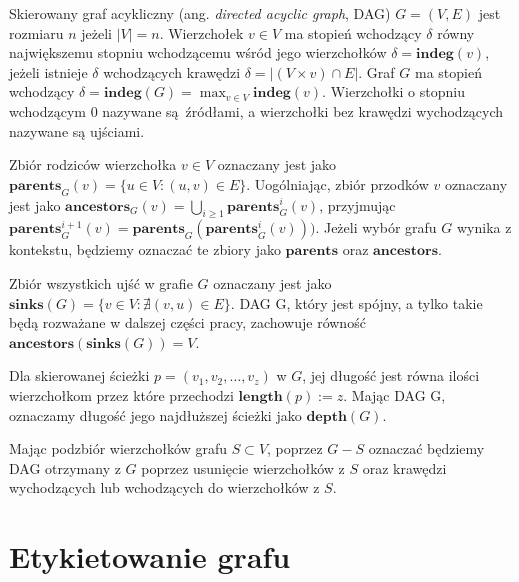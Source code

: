 Skierowany graf acykliczny (ang. \textit{directed acyclic graph}, DAG) $G = (V, E)$ jest rozmiaru $n$ jeżeli $|V| = n$.
Wierzchołek $v \in V$ ma stopień wchodzący $\delta$ równy największemu stopniu wchodzącemu wśród jego wierzchołków $\delta = \mathbf{indeg}(v)$, jeżeli istnieje $\delta$ wchodzących krawędzi $\delta = | \left( V \times {v} \right) \cap E|$.
Graf $G$ ma stopień wchodzący $ \delta = \mathbf{indeg}(G) = \max_{v \in V} \mathbf{indeg}(v)$.
Wierzchołki o stopniu wchodzącym 0 nazywane są źródłami, a wierzchołki bez krawędzi wychodzących nazywane są ujściami.

Zbiór rodziców wierzchołka $v \in V$ oznaczany jest jako $\mathbf{parents}_{G}(v) = \{ u \in V: (u, v) \in E \}$.
Uogólniając, zbiór przodków $v$ oznaczany jest jako $\mathbf{ancestors}_{G}(v) = \bigcup_{i \geq 1}\mathbf{parents}_{G}^{i}(v)$, przyjmując $\mathbf{parents}_{G}^{i+1}(v) = \mathbf{parents}_{G}(\mathbf{parents}_{G}^{i}(v)))$. Jeżeli wybór grafu $G$ wynika z kontekstu, będziemy oznaczać te zbiory jako $\mathbf{parents}$ oraz $\mathbf{ancestors}$.

Zbiór wszystkich ujść w grafie $G$ oznaczany jest jako $\mathbf{sinks}(G) = \{ v \in V : \nexists (v, u) \in E \}$. DAG G, który jest spójny, a tylko takie będą rozważane w dalszej części pracy, zachowuje równość $\mathbf{ancestors}(\mathbf{sinks}(G)) = V$.

Dla skierowanej ścieżki $p = (v_{1},v_{2},\dots,v_{z})$ w $G$, jej długość jest równa ilości wierzchołkom przez które przechodzi $\mathbf{length}(p) := z$.
Mając DAG G, oznaczamy długość jego najdłuższej ścieżki jako $\mathbf{depth}(G)$.

Mając podzbiór wierzchołków grafu $S \subset V$, poprzez $G - S$ oznaczać będziemy DAG otrzymany z $G$ poprzez usunięcie wierzchołków z $S$ oraz krawędzi wychodzących lub wchodzących do wierzchołków z $S$.

\section{Etykietowanie grafu}

